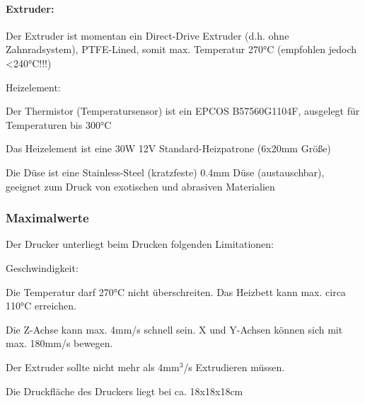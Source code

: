 \paragraph{Extruder:}
Der Extruder ist momentan ein Direct-Drive Extruder (d.h. ohne Zahnradsystem), PTFE-Lined, somit max. Temperatur 270°C (empfohlen jedoch <240°C!!!)
\begin{labeling}{Heizelement:}
\item[Thermistor:] Der Thermistor (Temperatursensor) ist ein EPCOS B57560G1104F, ausgelegt für Temperaturen bis 300°C
\item[Heizelement:] Das Heizelement ist eine 30W 12V Standard-Heizpatrone (6x20mm Größe)
\item[Düse:] Die Düse ist eine Stainless-Steel (kratzfeste) 0.4mm Düse (austauschbar), geeignet zum Druck von exotischen und abrasiven Materialien
\end{labeling}

\subsubsection{Maximalwerte}
Der Drucker unterliegt beim Drucken folgenden Limitationen:

\begin{labeling}{Geschwindigkeit:}
\item[Temperatur:] Die Temperatur darf 270°C nicht überschreiten. Das Heizbett kann max. circa 110°C erreichen.
\item[Geschwindigkeit:] Die Z-Achse kann max. 4mm/s schnell sein. 
X und Y-Achsen können sich mit max. 180mm/s bewegen.
\item[Extrusion:] Der Extruder sollte nicht mehr als 4mm$^3$/s Extrudieren müssen.
\item[Druckfläche:] Die Druckfläche des Druckers liegt bei ca. 18x18x18cm
\end{labeling}